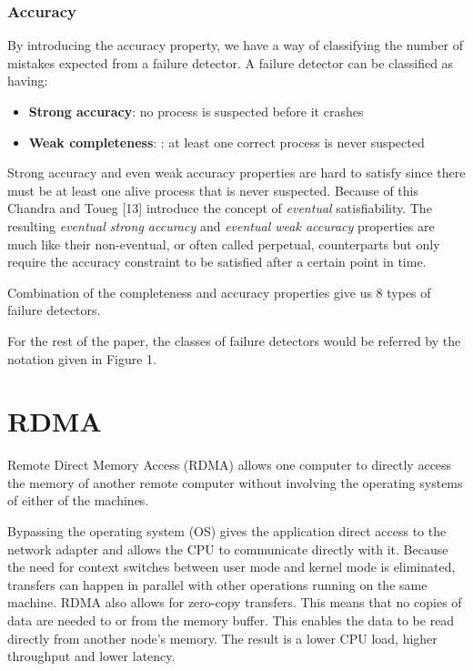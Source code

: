 \documentclass[bsc,frontabs,twoside,singlespacing,parskip,deptreport,hidel]{infthesis}     %
\begin{document}
\subsubsection*{Accuracy}

By introducing the accuracy property, we have a way of classifying the number of mistakes expected from a failure detector. A failure detector can be classified as having: 

\begin{itemize}
  \item \textbf{Strong accuracy}: no process is suspected before it crashes
  \item \textbf{Weak completeness}: : at least one correct process is never suspected
\end{itemize}

Strong accuracy and even weak accuracy properties are hard to satisfy since there must be at least one alive process that is never suspected.  Because of this Chandra and Toueg [13] introduce the concept of \textit{eventual} satisfiability.  The resulting \textit{eventual strong accuracy} and \textit{eventual weak accuracy} properties are much like their non-eventual, or often called perpetual, counterparts but only require the accuracy constraint to be satisfied after a certain point in time.

Combination of the completeness and accuracy properties give us 8 types of failure detectors.

For the rest of the paper, the classes of failure detectors would be referred by the notation given in Figure 1.

\section{RDMA}

Remote Direct Memory Access (RDMA) allows one computer to directly access the memory of another remote computer without involving the operating systems of either of the machines.

Bypassing the operating system (OS) gives the application direct access to the network adapter and allows the CPU to communicate directly with it. Because the need for context switches between user mode and kernel mode is eliminated, transfers can happen in parallel with other operations running on the same machine. RDMA also allows for zero-copy transfers. This means that no copies of data are needed to or from the memory buffer. This enables the data to be read directly from another node's memory. The result is a lower CPU load, higher throughput and lower latency.
\end{document}

